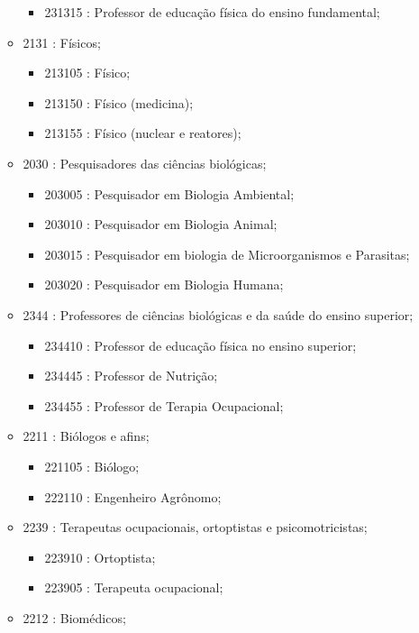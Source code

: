 \begin{itemize}
\begin{itemize}
    \begin{itemize}
      \item 231315 : Professor de educação física do ensino fundamental;
    \end{itemize}
    \item 2131 : Físicos;
    \begin{itemize}
      \item 213105 : Físico;
      \item 213150 : Físico (medicina);
      \item 213155 : Físico (nuclear e reatores);
    \end{itemize}
    \item 2030 : Pesquisadores das ciências biológicas;
    \begin{itemize}
      \item 203005 : Pesquisador em Biologia Ambiental;
      \item 203010 : Pesquisador em Biologia Animal;
      \item 203015 : Pesquisador em biologia de Microorganismos e Parasitas;
      \item 203020 : Pesquisador em Biologia Humana;
    \end{itemize}
    \item 2344 : Professores de ciências biológicas e da saúde do ensino superior;
    \begin{itemize}
      \item 234410 : Professor de educação física no ensino superior;
      \item 234445 : Professor de Nutrição;
      \item 234455 : Professor de Terapia Ocupacional;
    \end{itemize}
    \item 2211 : Biólogos e afins;
    \begin{itemize}
      \item 221105 : Biólogo;
      \item 222110 : Engenheiro Agrônomo;
    \end{itemize}
    \item 2239 : Terapeutas ocupacionais, ortoptistas e psicomotricistas;
    \begin{itemize}
      \item 223910 : Ortoptista;
      \item 223905 : Terapeuta ocupacional;
    \end{itemize}
    \item 2212 : Biomédicos;

\end{itemize}
\end{itemize}

